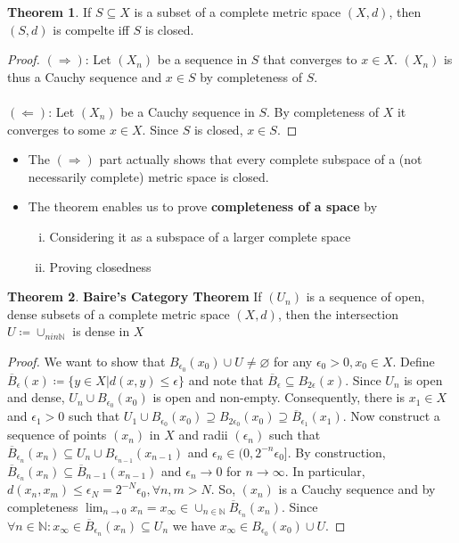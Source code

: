 \documentclass[10pt,a4paper]{article}
\theoremstyle{definition}
\theoremstyle{cor}
\theoremstyle{theorem}
\newtheorem{theorem}{Theorem}
\theoremstyle{lemma}
\theoremstyle{example}
\begin{document}
\begin{theorem}
If $S \subseteq X$ is a subset of a complete metric space $(X, d)$, then $(S, d)$ is compelte iff $S$ is closed.
\end{theorem}
\begin{proof}
$(\Rightarrow)$: Let $(X_n)$ be a sequence in $S$ that converges to $x\in X$. $(X_n)$ is thus a Cauchy sequence and $x\in S$ by completeness of $S$. \\ \\
$(\Leftarrow)$: Let $(X_n)$ be a Cauchy sequence in $S$. By completeness of $X$ it converges to some $x \in X$. Since $S$ is closed, $x \in S$. 
\end{proof}
\begin{itemize}
\item The $(\Rightarrow)$ part actually shows that every complete subspace of a (not necessarily complete) metric space is closed.
\item The theorem enables us to prove \textbf{completeness of a space} by 
\begin{enumerate}[(i)]
\item Considering it as a subspace of a larger complete space 
\item Proving closedness
\end{enumerate}
\end{itemize} 

\begin{theorem}
\textbf{Baire's Category Theorem} If $(U_n)$ is a sequence of open, dense subsets of a complete metric space $(X, d)$, then the intersection $U \coloneqq \cup_{n in \mathbb{N}}$ is dense in $X$
\end{theorem}
\begin{proof}
We want to show that $B_{\epsilon_0}(x_0) \cup U \neq \varnothing$ for any $\epsilon_0 > 0, x_0 \in X$. Define $\overline{B}_{\epsilon}(x) \coloneqq \{ y\in X|d(x,y)\leq \epsilon\}$ and note that $\overline{B}_{\epsilon} \subseteq B_{2\epsilon}(x)$. Since $U_n$ is open and dense, $U_n \cup B_{\epsilon_0}(x_0)$ is open and non-empty. Consequently, there is $x_1\in X$ and $\epsilon_1 > 0$ such that $U_1 \cup B_{\epsilon_0}(x_0) \supseteq B_{2\epsilon_0}(x_0) \supseteq \overline{B}_{\epsilon_1}(x_1)$. Now construct a sequence of points $(x_n)$ in $X$ and radii $(\epsilon_n)$ such that $\overline{B}_{\epsilon_n}(x_n) \subseteq U_n \cup B_{\epsilon_{n-1}}(x_{n-1})$ and $\epsilon_n \in (0, 2^{-n}\epsilon_0]$. By construction, $\overline{B}_{\epsilon_n}(x_n) \subseteq \overline{B}_{n-1}(x_{n-1})$ and $\epsilon_n \rightarrow 0$ for $n\rightarrow \infty$. In particular, $d(x_n, x_m)\leq \epsilon_N = 2^{-N}\epsilon_0, \forall n,m >N$. So, $(x_n)$ is a Cauchy sequence and by completeness $\lim_{n\rightarrow 0} x_n = x_{\infty} \in \cup_{n\in \mathbb{N}} \overline{B}_{\epsilon_n}(x_n)$. Since $\forall n \in \mathbb{N}: x_{\infty} \in \overline{B}_{\epsilon_n}(x_n)\subseteq U_n$ we have $x_{\infty} \in B_{\epsilon_0}(x_0) \cup U$.
\end{proof}
\end{document}
